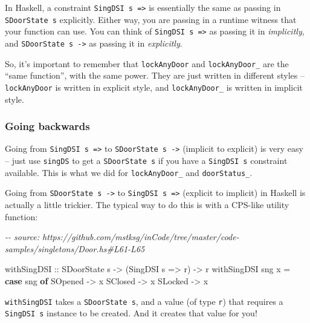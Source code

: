 \documentclass[]{article}
\newenvironment{Shaded}{}{}
\newcommand{\CommentTok}[1]{\textcolor[rgb]{0.38,0.63,0.69}{\textit{#1}}}
\newcommand{\DataTypeTok}[1]{\textcolor[rgb]{0.56,0.13,0.00}{#1}}
\newcommand{\KeywordTok}[1]{\textcolor[rgb]{0.00,0.44,0.13}{\textbf{#1}}}
\newcommand{\NormalTok}[1]{#1}
\newcommand{\OtherTok}[1]{\textcolor[rgb]{0.00,0.44,0.13}{#1}}
\begin{document}
In Haskell, a constraint \texttt{SingDSI\ s\ =\textgreater{}} is essentially the
same as passing in \texttt{SDoorState\ s} explicitly. Either way, you are
passing in a runtime witness that your function can use. You can think of
\texttt{SingDSI\ s\ =\textgreater{}} as passing it in \emph{implicitly}, and
\texttt{SDoorState\ s\ -\textgreater{}} as passing it in \emph{explicitly}.

So, it's important to remember that \texttt{lockAnyDoor} and
\texttt{lockAnyDoor\_} are the ``same function'', with the same power. They are
just written in different styles -- \texttt{lockAnyDoor} is written in explicit
style, and \texttt{lockAnyDoor\_} is written in implicit style.

\hypertarget{going-backwards}{%
\subsubsection{Going backwards}\label{going-backwards}}

Going from \texttt{SingDSI\ s\ =\textgreater{}} to
\texttt{SDoorState\ s\ -\textgreater{}} (implicit to explicit) is very easy --
just use \texttt{singDS} to get a \texttt{SDoorState\ s} if you have a
\texttt{SingDSI\ s} constraint available. This is what we did for
\texttt{lockAnyDoor\_} and \texttt{doorStatus\_}.

Going from \texttt{SDoorState\ s\ -\textgreater{}} to
\texttt{SingDSI\ s\ =\textgreater{}} (explicit to implicit) in Haskell is
actually a little trickier. The typical way to do this is with a CPS-like
utility function:

\begin{Shaded}
\begin{Highlighting}[]
\CommentTok{{-}{-} source: https://github.com/mstksg/inCode/tree/master/code{-}samples/singletons/Door.hs\#L61{-}L65}

\OtherTok{withSingDSI ::} \DataTypeTok{SDoorState}\NormalTok{ s }\OtherTok{{-}>}\NormalTok{ (}\DataTypeTok{SingDSI}\NormalTok{ s }\OtherTok{=>}\NormalTok{ r) }\OtherTok{{-}>}\NormalTok{ r}
\NormalTok{withSingDSI sng x }\OtherTok{=} \KeywordTok{case}\NormalTok{ sng }\KeywordTok{of}
    \DataTypeTok{SOpened} \OtherTok{{-}>}\NormalTok{ x}
    \DataTypeTok{SClosed} \OtherTok{{-}>}\NormalTok{ x}
    \DataTypeTok{SLocked} \OtherTok{{-}>}\NormalTok{ x}
\end{Highlighting}
\end{Shaded}

\texttt{withSingDSI} takes a \texttt{SDoorState\ s}, and a value (of type
\texttt{r}) that requires a \texttt{SingDSI\ s} instance to be created. And it
creates that value for you!
\end{document}
